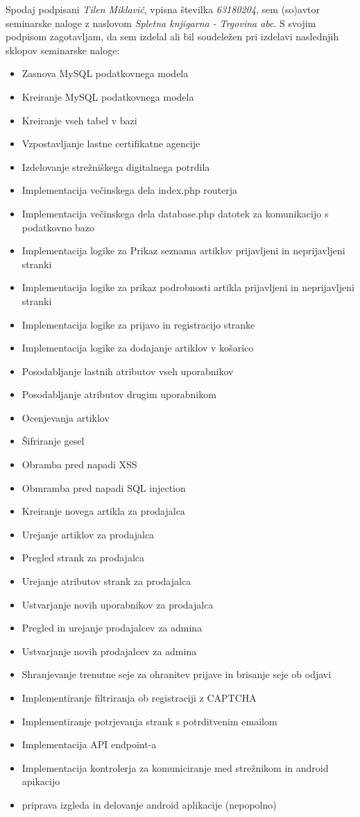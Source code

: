 \documentclass[a4paper,12pt]{report}
\newcommand{\naslov}     {Spletna knjigarna - Trgovina abc}
\newcommand{\prviavtor}  {Tilen Miklavič}
\newcommand{\prviindeks} {63180204}
\begin{document}
Spodaj podpisani \textit{\prviavtor}, vpisna številka \textit{\prviindeks}, sem (so)avtor seminarske naloge z naslovom \textit{\naslov}. S svojim podpisom zagotavljam, da sem izdelal ali bil soudeležen pri izdelavi naslednjih sklopov seminarske naloge:
\begin{itemize}
    \item Zasnova MySQL podatkovnega modela 
	\item Kreiranje MySQL podatkovnega modela
	\item Kreiranje vseh tabel v bazi
	\item Vzpostavljanje lastne certifikatne agencije 
	\item Izdelovanje strežniškega digitalnega potrdila
	\item Implementacija večinskega dela index.php routerja
	\item Implementacija večinskega dela database.php datotek za komunikacijo s podatkovno bazo 
	\item Implementacija logike za Prikaz seznama artiklov prijavljeni in neprijavljeni stranki 
	\item Implementacija logike za prikaz podrobnosti artikla prijavljeni in neprijavljeni stranki 
	\item Implementacija logike za prijavo in registracijo stranke 
	\item Implementacija logike za dodajanje artiklov v košarico 
	\item Posodabljanje lastnih atributov vseh uporabnikov 
	\item Posodabljanje atributov drugim uporabnikom 
	\item Ocenjevanja artiklov 
	\item Šifriranje gesel 
	\item Obramba pred napadi XSS
	\item Obmramba pred napadi SQL injection 
	\item Kreiranje novega artikla za prodajalca
	\item Urejanje artiklov za prodajalca 
	\item Pregled strank za prodajalca 
	\item Urejanje atributov strank za prodajalca
	\item Ustvarjanje novih uporabnikov za prodajalca
	\item Pregled in urejanje prodajalcev za admina 
	\item Ustvarjanje novih prodajalcev za admina
	\item Shranjevanje trenutne seje za ohranitev prijave in brisanje seje ob odjavi 
	\item Implementiranje filtriranja ob registraciji z CAPTCHA
	\item Implementiranje potrjevanja strank s potrditvenim emailom
	\item Implementacija API endpoint-a
	\item Implementacija kontrolerja za komuniciranje med strežnikom in android apikacijo 
	\item priprava izgleda in delovanje android aplikacije (nepopolno)
	
\end{itemize}
\end{document}
